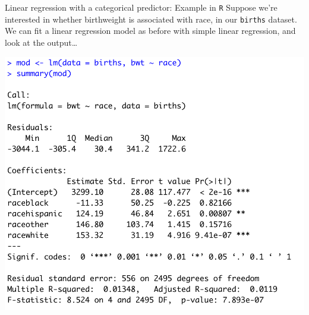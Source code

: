 \documentclass[10pt,t]{beamer}
\begin{document}
\begin{frame}{Linear regression with a categorical predictor: Example in \texttt{R}}
Suppose we're interested in whether birthweight is associated with race, in our \texttt{births} dataset. We can fit a linear regression model as before with simple linear regression, and look at the output\dots

\vspace{0.3cm}

\centering

\includegraphics[scale=0.4]{multilevel_cat_lm.png}

\end{frame}
\end{document}
